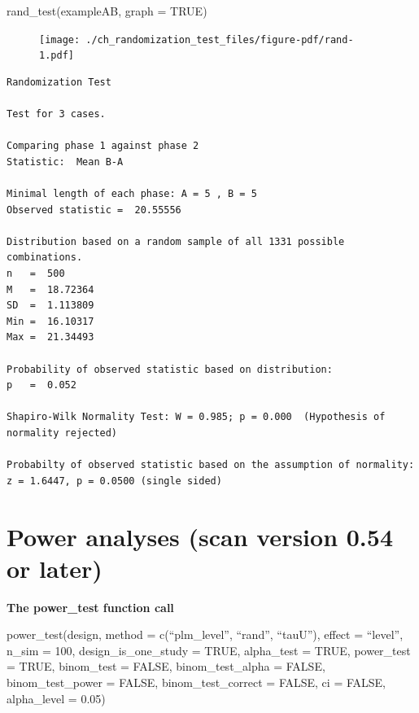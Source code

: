 \documentclass[
  letterpaper,
  DIV=11,
  numbers=noendperiod]{scrreprt}
\newenvironment{Shaded}{\begin{snugshade}}{\end{snugshade}}
\newcommand{\AttributeTok}[1]{\textcolor[rgb]{0.40,0.45,0.13}{#1}}
\newcommand{\ConstantTok}[1]{\textcolor[rgb]{0.56,0.35,0.01}{#1}}
\newcommand{\FunctionTok}[1]{\textcolor[rgb]{0.28,0.35,0.67}{#1}}
\newcommand{\NormalTok}[1]{\textcolor[rgb]{0.00,0.23,0.31}{#1}}
\begin{document}
\begin{Shaded}
\begin{Highlighting}[]
\FunctionTok{rand\_test}\NormalTok{(exampleAB, }\AttributeTok{graph =} \ConstantTok{TRUE}\NormalTok{)}
\end{Highlighting}
\end{Shaded}

\begin{figure}[H]

{\centering \texttt{[image: ./ch\_randomization\_test\_files/figure-pdf/rand-1.pdf]}

}

\end{figure}

\begin{verbatim}
Randomization Test

Test for 3 cases.

Comparing phase 1 against phase 2 
Statistic:  Mean B-A 

Minimal length of each phase: A = 5 , B = 5 
Observed statistic =  20.55556 

Distribution based on a random sample of all 1331 possible combinations.
n   =  500 
M   =  18.72364 
SD  =  1.113809 
Min =  16.10317 
Max =  21.34493 

Probability of observed statistic based on distribution:
p   =  0.052 

Shapiro-Wilk Normality Test: W = 0.985; p = 0.000  (Hypothesis of normality rejected)

Probabilty of observed statistic based on the assumption of normality:
z = 1.6447, p = 0.0500 (single sided)
\end{verbatim}

\hypertarget{power-analyses-scan-version-0.54-or-later}{%
\chapter{Power analyses (scan version 0.54 or
later)}\label{power-analyses-scan-version-0.54-or-later}}

\begin{tcolorbox}[enhanced jigsaw, breakable, rightrule=.15mm, bottomrule=.15mm, arc=.35mm, colback=white, colframe=quarto-callout-tip-color-frame, opacityback=0, leftrule=.75mm, toprule=.15mm, left=2mm]
\begin{minipage}[t]{5.5mm}
\textcolor{quarto-callout-tip-color}{\faLightbulb}
\end{minipage}%
\begin{minipage}[t]{\textwidth - 5.5mm}

\textbf{The power\_test function call}\vspace{2mm}

power\_test(design, method = c(``plm\_level'', ``rand'', ``tauU''),
effect = ``level'', n\_sim = 100, design\_is\_one\_study = TRUE,
alpha\_test = TRUE, power\_test = TRUE, binom\_test = FALSE,
binom\_test\_alpha = FALSE, binom\_test\_power = FALSE,
binom\_test\_correct = FALSE, ci = FALSE, alpha\_level = 0.05)

\end{minipage}%
\end{tcolorbox}
\end{document}

